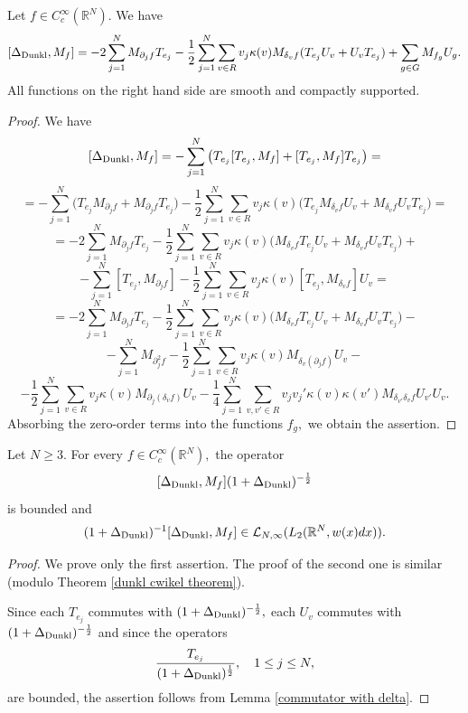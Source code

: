 \documentclass{amsart}
\begin{document}
\begin{lemma}\label{commutator with delta} Let $f\in C^{\infty}_c(\mathbb{R}^N).$ We have
$$[\Delta_{{\rm Dunkl}},M_f]=-2\sum_{j=1}^NM_{\partial_jf}T_{e_j}-\frac12\sum_{j=1}^N\sum_{v\in R}v_j\kappa(v)M_{\delta_vf}(T_{e_j}U_v+U_vT_{e_j})+\sum_{g\in G}M_{f_g}U_g.$$
All functions on the right hand side are smooth and compactly supported.
\end{lemma}
\begin{proof} We have
$$[\Delta_{{\rm Dunkl}},M_f]=-\sum_{j=1}^N\big(T_{e_j}[T_{e_j},M_f]+[T_{e_j},M_f]T_{e_j}\big)=$$
$$=-\sum_{j=1}^N\big(T_{e_j}M_{\partial_jf}+M_{\partial_jf}T_{e_j}\big)-\frac12\sum_{j=1}^N\sum_{v\in R}v_j\kappa(v)\big(T_{e_j}M_{\delta_vf}U_v+M_{\delta_vf}U_vT_{e_j}\big)=$$
$$=-2\sum_{j=1}^NM_{\partial_jf}T_{e_j}-\frac12\sum_{j=1}^N\sum_{v\in R}v_j\kappa(v)\big(M_{\delta_vf}T_{e_j}U_v+M_{\delta_vf}U_vT_{e_j}\big)+$$
$$-\sum_{j=1}^N[T_{e_j},M_{\partial_jf}]-\frac12\sum_{j=1}^N\sum_{v\in R}v_j\kappa(v)[T_{e_j},M_{\delta_vf}]U_v=$$
$$=-2\sum_{j=1}^NM_{\partial_jf}T_{e_j}-\frac12\sum_{j=1}^N\sum_{v\in R}v_j\kappa(v)\big(M_{\delta_vf}T_{e_j}U_v+M_{\delta_vf}U_vT_{e_j}\big)-$$
$$-\sum_{j=1}^NM_{\partial_j^2f}-\frac12\sum_{j=1}^N\sum_{v\in R}v_j\kappa(v)M_{\delta_v(\partial_jf)}U_v-$$
$$-\frac12\sum_{j=1}^N\sum_{v\in R}v_j\kappa(v)M_{\partial_j(\delta_vf)}U_v-\frac14\sum_{j=1}^N\sum_{v,v'\in R}v_jv_j'\kappa(v)\kappa(v')M_{\delta_{v'}\delta_vf}U_{v'}U_v.$$
Absorbing the zero-order terms into the functions $f_g,$ we obtain the assertion.
\end{proof}

\begin{lemma}\label{base of induction} Let $N\geq3.$ For every $f\in C^{\infty}_c(\mathbb{R}^N),$ the operator
$$[\Delta_{{\rm Dunkl}},M_f](1+\Delta_{{\rm Dunkl}})^{-\frac12}$$
is bounded and
$$(1+\Delta_{{\rm Dunkl}})^{-1}[\Delta_{{\rm Dunkl}},M_f]\in \mathcal{L}_{N,\infty}(L_2(\mathbb{R}^N,w(x)dx)).$$
\end{lemma}
\begin{proof} We prove only the first assertion. The proof of the second one is similar (modulo Theorem \ref{dunkl cwikel theorem}).

Since each $T_{e_j}$ commutes  with $(1+\Delta_{{\rm Dunkl}})^{-\frac12},$ each $U_v$ commutes with $(1+\Delta_{{\rm Dunkl}})^{-\frac12}$ and since the operators
$$\frac{T_{e_j}}{(1+\Delta_{{\rm Dunkl}})^{\frac12}},\quad 1\leq j\leq N,$$
are bounded, the assertion follows from Lemma \ref{commutator with delta}.
\end{proof}
\end{document}
